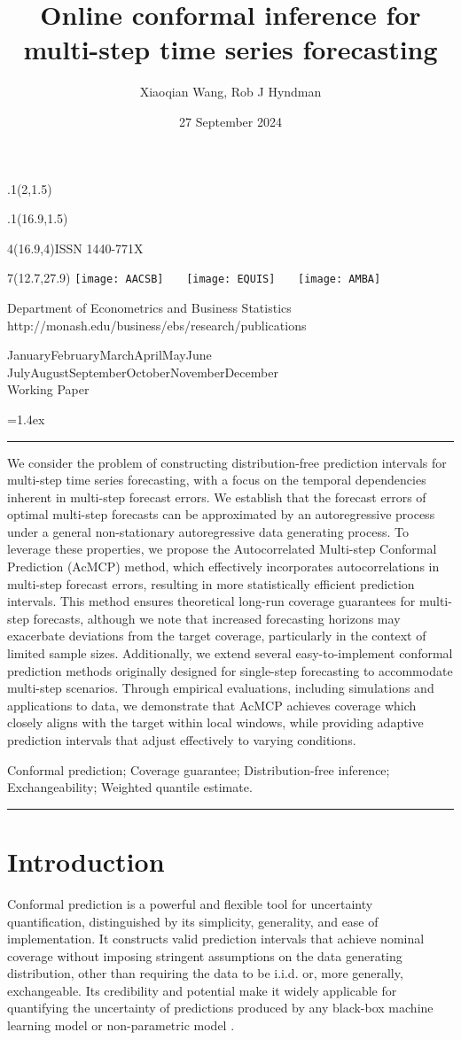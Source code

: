 \documentclass[
  11pt,
  a4paper,
]{article}
\title{Online conformal inference for multi-step time series
forecasting}
\date{27 September 2024}
\author{Xiaoqian Wang, Rob J Hyndman}
\makeatletter
\theoremstyle{plain}
\theoremstyle{remark}
\def\placefig#1#2#3#4{\begin{textblock}{.1}(#1,#2)\rlap{\texttt{[image: \#4]}}\end{textblock}}
\def\Date{\number\day}
\def\Month{\ifcase\month\or
 January\or February\or March\or April\or May\or June\or
 July\or August\or September\or October\or November\or December\fi}
\def\Year{\number\year}
\def\showjel{{\large\textsf{\textbf{JEL classification:}}~\@jel}}
\def\cover{{\sffamily\setcounter{page}{0}
        \thispagestyle{empty}
        \placefig{2}{1.5}{width=5cm}{monash2}
        \placefig{16.9}{1.5}{width=2.1cm}{MBSportrait}
        \begin{textblock}{4}(16.9,4)ISSN 1440-771X\end{textblock}
        \begin{textblock}{7}(12.7,27.9)\hfill
        \texttt{[image: AACSB]}~~~
        \texttt{[image: EQUIS]}~~~
        \texttt{[image: AMBA]}
        \end{textblock}
        \vspace*{2.5cm}
        \begin{center}\Large
        Department of Econometrics and Business Statistics\\[.5cm]
        \footnotesize http://monash.edu/business/ebs/research/publications
        \end{center}\vspace{2cm}
        \begin{center}
        \fbox{\parbox{14cm}{\begin{onehalfspace}\centering\Huge\vspace*{0.3cm}
                \textsf{\textbf{\expandafter{\@title}}}\vspace{1cm}\par
                \LARGE
                \expandafter{\@author}
                \end{onehalfspace}
        }}
        \end{center}
        \vfill
                \begin{center}\Large
                \Month~\Year\\[1cm]
                Working Paper \@wp
        \end{center}\vspace*{2cm}}}
\def\pageone{{\sffamily\setstretch{1}%
        \thispagestyle{empty}%
        \vbox to \textheight{%
        \raggedright\baselineskip=1.2cm
     {\fontsize{24.88}{30}\sffamily\textbf{\expandafter{\@title}}}
        \vspace{2cm}\par
        \hspace{1cm}\parbox{14cm}{\sffamily\large\@addresses}\vspace{1cm}\vfill
        \hspace{1cm}{\large\Date~\Month~\Year}\\[1cm]
        \hspace{1cm}\showjel\vss}}}
\def\blindtitle{{\sffamily
     \thispagestyle{plain}\raggedright\baselineskip=1.2cm
     {\fontsize{24.88}{30}\sffamily\textbf{\expandafter{\@title}}}\vspace{1cm}\par
        }}
\def\titlepage{{\cover\newpage\pageone\newpage\blindtitle}}
\let\maketitle\titlepage
\newenvironment{keywords}{\par\vspace{0.5cm}\noindent{\sffamily\textbf{Keywords:}}}{\vspace{0.25cm}\par\hrule\vspace{0.5cm}\par}
\renewenvironment{abstract}{\begin{minipage}{\textwidth}\parskip=1.4ex\noindent
\hrule\vspace{0.1cm}\par{\sffamily\textbf{\abstractname}}\newline\setstretch{1.1}}
  {\end{minipage}}
\makeatother
\begin{document}
\maketitle

\begin{abstract}
We consider the problem of constructing distribution-free prediction
intervals for multi-step time series forecasting, with a focus on the
temporal dependencies inherent in multi-step forecast errors. We
establish that the forecast errors of optimal multi-step forecasts can
be approximated by an autoregressive process under a general
non-stationary autoregressive data generating process. To leverage these
properties, we propose the Autocorrelated Multi-step Conformal
Prediction (AcMCP) method, which effectively incorporates
autocorrelations in multi-step forecast errors, resulting in more
statistically efficient prediction intervals. This method ensures
theoretical long-run coverage guarantees for multi-step forecasts,
although we note that increased forecasting horizons may exacerbate
deviations from the target coverage, particularly in the context of
limited sample sizes. Additionally, we extend several easy-to-implement
conformal prediction methods originally designed for single-step
forecasting to accommodate multi-step scenarios. Through empirical
evaluations, including simulations and applications to data, we
demonstrate that AcMCP achieves coverage which closely aligns with the
target within local windows, while providing adaptive prediction
intervals that adjust effectively to varying conditions.
\end{abstract}

\begin{keywords}
  Conformal prediction; Coverage guarantee; Distribution-free
inference; Exchangeability; 
  Weighted quantile estimate.
\end{keywords}


\section{Introduction}\label{sec-intro}

Conformal prediction \autocite{vovk2005} is a powerful and flexible tool
for uncertainty quantification, distinguished by its simplicity,
generality, and ease of implementation. It constructs valid prediction
intervals that achieve nominal coverage without imposing stringent
assumptions on the data generating distribution, other than requiring
the data to be i.i.d. or, more generally, exchangeable. Its credibility
and potential make it widely applicable for quantifying the uncertainty
of predictions produced by any black-box machine learning model
\autocite{shafer2008,papadopoulos2008,barber2021} or non-parametric
model \autocite{lei2014}.
\end{document}
